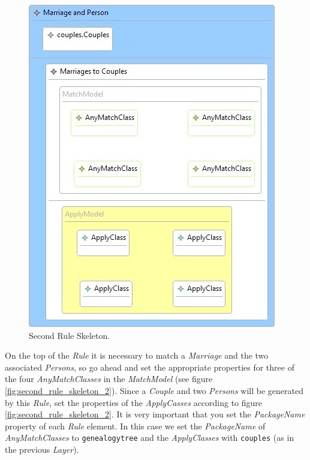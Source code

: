 \begin{figure}[h]
\begin{center}
  \includegraphics[scale=0.7]{imgs/second_rule_skeleton.jpg}
  \caption{Second Rule Skeleton.}
  \label{fig:second_rule_skeleton}
\end{center}
\end{figure}

On the top of the \emph{Rule} it is necessary to match a \emph{Marriage} and the
two associated \emph{Persons}, so go ahead and set the appropriate properties
for three of the four \emph{AnyMatchClasses} in the \emph{MatchModel} (see
figure \ref{fig:second_rule_skeleton_2}). Since a \emph{Couple} and two
\emph{Persons} will be generated by this \emph{Rule}, set the properties of the
\emph{ApplyCasses} according to figure \ref{fig:second_rule_skeleton_2}. It is
very important that you set the \emph{PackageName} property of each \emph{Rule}
element. In this case we set the \emph{PackageName} of \emph{AnyMatchClasses} to
\verb=genealogytree=  and the \emph{ApplyClasses} with \verb=couples= (as
in the previous \emph{Layer}).

